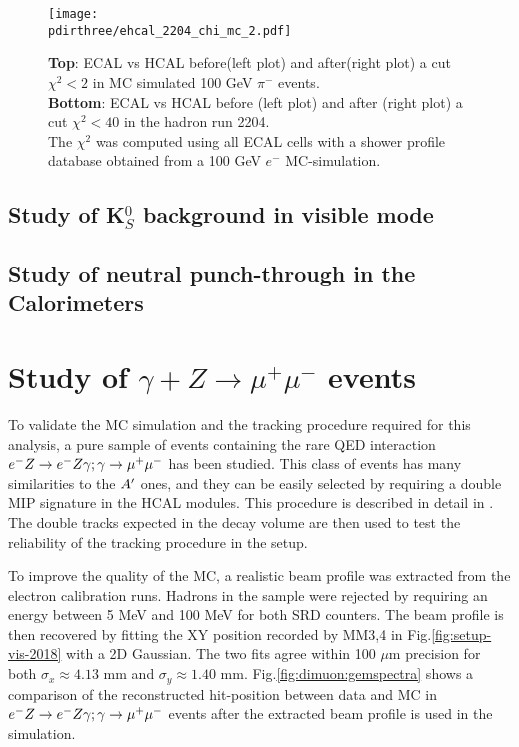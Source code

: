 \begin{figure}[h!]
  \begin{center}
    \texttt{[image: \\pdirthree/ehcal\_2204\_chi\_mc\_2.pdf]}
  \end{center}
  \caption{\textbf{Top}: ECAL vs HCAL before(left plot) and
    after(right plot) a cut
    $\chi^2<2$ in MC simulated 100 GeV $\pi^-$ events. \\
    \textbf{Bottom}: ECAL vs HCAL before (left plot) and after (right
    plot) a cut
    $\chi^2<40$ in the hadron run 2204.\\
    The $\chi^2$ was computed using all ECAL cells with a shower
    profile database obtained from a 100 GeV $e^-$ MC-simulation. }
  \label{fig:ehcal_hadr}
\end{figure}

\clearpage
\newpage

\subsection{Study of K$^0_S$ background in visible mode}
\label{ch3:sec:bkg-k0s}

\subsection{Study of neutral punch-through in the Calorimeters}
\label{ch3:sec:bkg-neutrals}

\section{Study of $\gamma + Z \rightarrow \mu^+ \mu^-$ events }
\label{ch3:sec:dimuons}

To validate the MC simulation and the tracking procedure required for this analysis, a pure sample of events containing the rare QED interaction $e^- Z \to e^- Z \gamma; \gamma \to \mu^+ \mu^-$ has been studied. This class of events has many similarities to the $A'$ ones, and they can be easily selected by requiring a double MIP signature in the HCAL modules. This procedure is described in detail in \cite{na64-prd}. The double tracks expected in the decay volume are then used to test the reliability of the tracking procedure in the setup.

To improve the quality of the MC, a realistic beam profile was extracted from the electron calibration runs. Hadrons in the sample were rejected by requiring an energy between 5 MeV and 100 MeV for both SRD counters. The beam profile is then recovered by fitting the XY position recorded by MM3,4 in Fig.\ref{fig:setup-vis-2018} with a 2D Gaussian. The two fits agree within 100 $\mu$m precision for both $\sigma_x \approx 4.13$ mm and $\sigma_y \approx 1.40$ mm. Fig.\ref{fig:dimuon:gemspectra} shows a comparison of the reconstructed hit-position between data and MC in $e^- Z \to e^- Z \gamma; \gamma \to \mu^+ \mu^-$ events after the extracted beam profile is used in the simulation.

